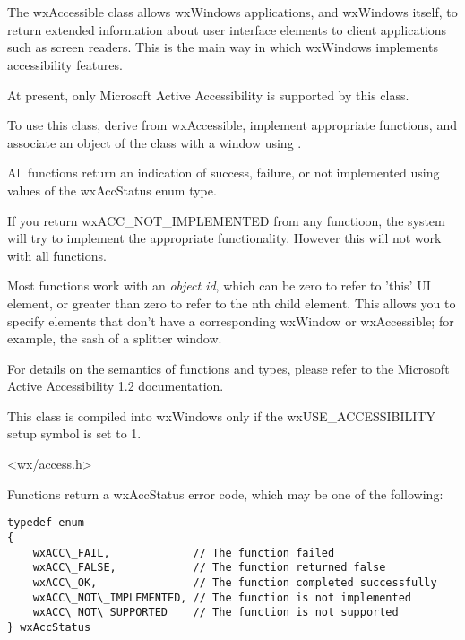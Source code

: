 %
%

\section{}\label{wxaccessible}

The wxAccessible class allows wxWindows applications, and
wxWindows itself, to return extended information about user interface elements
to client applications such as screen readers. This is the
main way in which wxWindows implements accessibility features.

At present, only Microsoft Active Accessibility is supported
by this class.

To use this class, derive from wxAccessible, implement appropriate
functions, and associate an object of the class with a
window using .

All functions return an indication of success, failure, or not implemented
using values of the wxAccStatus enum type.

If you return wxACC\_NOT\_IMPLEMENTED from any functioon, the system will try to
implement the appropriate functionality. However this will not work with
all functions.

Most functions work with an {\it object id}, which can be zero to refer to
'this' UI element, or greater than zero to refer to the nth child element.
This allows you to specify elements that don't have a corresponding wxWindow or
wxAccessible; for example, the sash of a splitter window.

For details on the semantics of functions and types, please refer to the
Microsoft Active Accessibility 1.2 documentation.

This class is compiled into wxWindows only if the wxUSE\_ACCESSIBILITY setup
symbol is set to 1.




<wx/access.h>


Functions return a wxAccStatus error code, which
may be one of the following:

{\small \begin{verbatim}
typedef enum
{
    wxACC\_FAIL,             // The function failed
    wxACC\_FALSE,            // The function returned false
    wxACC\_OK,               // The function completed successfully
    wxACC\_NOT\_IMPLEMENTED, // The function is not implemented
    wxACC\_NOT\_SUPPORTED    // The function is not supported
} wxAccStatus
\end{verbatim}}

